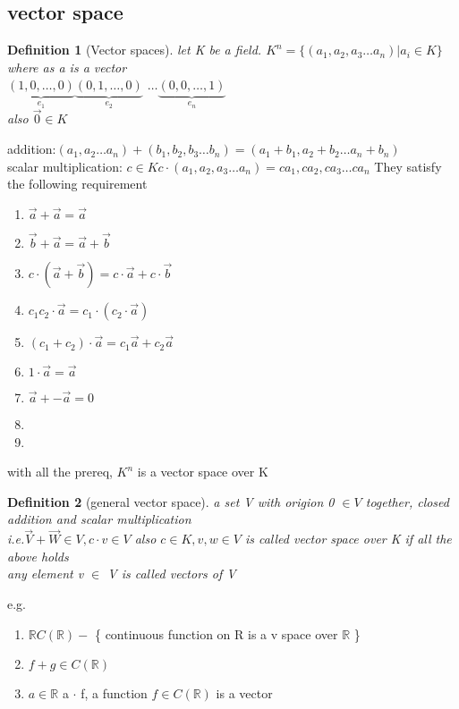 \documentclass{article}
\newtheorem*{definition}{Definition}
\newcommand{\R}{\mathbb{R}}
\begin{document}
\subsection{vector space}
\begin{definition}[Vector spaces]
let K be a field. $K^n=\{(a_1,a_2,a_3\dots a_n)| a_i\in K\}$ where as a is a vector\\
$\underbrace{(1,0,\dots ,0)}_{e_1}$$\underbrace{(0,1,\dots ,0)}_{e_2}$ $\dots $$\underbrace{(0,0,\dots ,1)}_{e_n}$\\
also $\Vec{0} \in K$

\end{definition}

addition:$(a_1,a_2 \dots a_n)+(b_1,b_2,b_3\dots b_n)=(a_1+b_1,a_2+b_2\dots a_n+b_n)$\\
scalar multiplication: $c\in K c \cdot (a_1,a_2,a_3\dots a_n)=ca_1,ca_2,ca_3\dots ca_n$
They satisfy the following requirement
\begin{enumerate}
    \item $\Vec{a}+\Vec{a}=\Vec{a}$
    \item $\Vec{b}+\Vec{a}=\Vec{a}+\Vec{b}$
    \item $c \cdot (\Vec{a}+\Vec{b}) =c\cdot \Vec{a}+c \cdot \Vec{b}$
    \item$c_1c_2\cdot \Vec{a}=c_1\cdot(c_2\cdot \Vec{a})$
    \item $(c_1+c_2)\cdot \Vec{a}= c_1\Vec{a}+c_2\Vec{a}$
    \item $1 \cdot \Vec{a}=\Vec{a}$
    \item $\Vec{a}+-\Vec{a}=0$
    \item 
    \item \end{enumerate}

    with all the prereq, $K^n$ is a vector space over K
\begin{definition}[general vector space]
a set V with origion 0 $\in V$ together, closed addition and scalar multiplication\\
i.e.$ \Vec{V}+\Vec{W}\in V, c \cdot v \in V $ also $c \in K, v,w \in V$ is called vector space over K if all the above holds\\
any element v $\in$ V is called vectors of V\\



    
\end{definition}


e.g.
\begin{enumerate}
    \item $\R C(\R)-$ \{ continuous function on R is a v space over $\R$ \}
    \item $f+g \in C(\R)$
    \item $a \in \R$ a $\cdot $ f, a function $f \in C(\R) $ is a vector
\end{enumerate}
\end{document}
